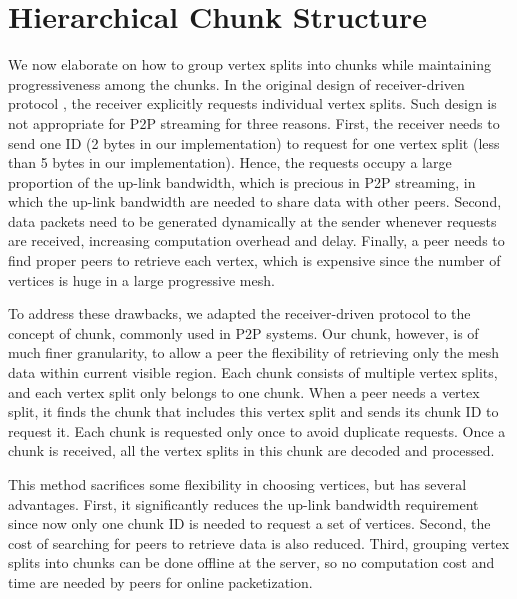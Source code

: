 \section{Hierarchical Chunk Structure}
\label{s:chunk}
We now elaborate on how to group vertex splits into chunks while maintaining
progressiveness among the chunks.
    In the original design of receiver-driven protocol \cite{Cheng2008}, 
    the receiver explicitly requests individual vertex splits.
    Such design is not appropriate for P2P streaming for three reasons. 
    First, %
    the receiver needs to send one ID (2 bytes in our implementation)
    to request for one vertex split (less than 5 bytes in our
    implementation).
    Hence, the requests occupy a large proportion of the up-link bandwidth,
    which is precious in P2P streaming, in which the up-link bandwidth
    are needed to share data with other peers. 
    Second, data packets need to be generated dynamically at the
    sender whenever requests are received, increasing
    computation overhead and delay. 
    Finally, a peer needs to find proper
    peers to retrieve each vertex, which is expensive since the 
    number of vertices is huge in a large progressive mesh.

    To address these drawbacks, we adapted the receiver-driven
    protocol to the concept of chunk, commonly used in P2P systems.
    Our chunk, however, is of much finer granularity, to allow a peer
    the flexibility of retrieving only the %
    mesh data within current visible region.
    Each chunk consists of multiple vertex splits, and each vertex
    split only belongs to one chunk. When a peer needs a vertex split,
    it finds the chunk that includes this vertex split and sends its
    chunk ID to request it. Each chunk is requested only once to avoid
    duplicate requests.
    Once a chunk is received, 
    all the vertex splits in this chunk are decoded and processed.
    
    This method sacrifices some flexibility in choosing vertices,
    but has several advantages. First, 
    it significantly reduces the up-link bandwidth requirement since
    now only one chunk ID is needed to request a set of vertices.
    Second, the cost of searching for peers to retrieve data is also reduced.
    Third, grouping vertex splits into chunks can be done offline at
    the server, so no computation cost and time are needed by peers 
    for online packetization. 
    
